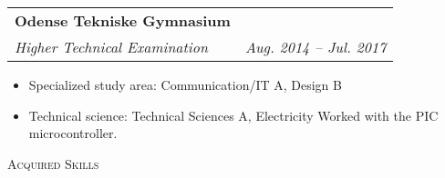 \documentclass[11pt]{article}
\makeatletter
\newcommand{\resumeSubheading}[4]{
  \noindent\begin{tabular*}{0.98\textwidth}[t]{l@{\extracolsep{\fill}}r}
    \textbf{#1} & #2 \\ \vspace{-3pt} 
    \textit{\small#3} & \textit{\small #4} 
  \end{tabular*}\vspace{7pt}
}
\makeatother
\begin{document}
\resumeSubheading{Odense Tekniske Gymnasium}{}{Higher Technical
Examination}{Aug. 2014 -- Jul. 2017}
{\small \begin{itemize}\vspace{-0.25cm}
  \setlength{\itemsep}{-1pt}
  \item Specialized study area: Communication/IT A, Design B
  \item Technical science: Technical Sciences A, Electricity
    \subitem\footnotesize Worked with the PIC microcontroller.
\end{itemize}}


\vspace{0.5cm}

\noindent\large{\scshape{Acquired Skills}} \newline
\noindent{\rule[0.3cm]{\textwidth}{0.4pt}}
\end{document}
